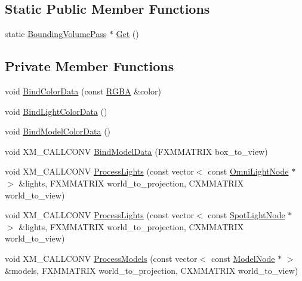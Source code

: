 \subsection*{Static Public Member Functions}
\begin{DoxyCompactItemize}
\item 
static \hyperlink{classmage_1_1_bounding_volume_pass}{Bounding\+Volume\+Pass} $\ast$ \hyperlink{classmage_1_1_bounding_volume_pass_a254c44c1c9f18967c9d6cdb6e53d3bcd}{Get} ()
\end{DoxyCompactItemize}
\subsection*{Private Member Functions}
\begin{DoxyCompactItemize}
\item 
void \hyperlink{classmage_1_1_bounding_volume_pass_a29a98f857f8ae45a0230b96f78f2dcb9}{Bind\+Color\+Data} (const \hyperlink{structmage_1_1_r_g_b_a}{R\+G\+BA} \&color)
\item 
void \hyperlink{classmage_1_1_bounding_volume_pass_a9dcca637d98ea8335777094d3d994f5c}{Bind\+Light\+Color\+Data} ()
\item 
void \hyperlink{classmage_1_1_bounding_volume_pass_af4591758a8dfa7cd19a0f87a0273e470}{Bind\+Model\+Color\+Data} ()
\item 
void X\+M\+\_\+\+C\+A\+L\+L\+C\+O\+NV \hyperlink{classmage_1_1_bounding_volume_pass_ae84dd1e056235a5fdbc7c496b6b99d1d}{Bind\+Model\+Data} (F\+X\+M\+M\+A\+T\+R\+IX box\+\_\+to\+\_\+view)
\item 
void X\+M\+\_\+\+C\+A\+L\+L\+C\+O\+NV \hyperlink{classmage_1_1_bounding_volume_pass_a07613a3b98f9e6cc0cde4affab9051cc}{Process\+Lights} (const vector$<$ const \hyperlink{namespacemage_a1724c6e6b6b5ba535cdd967cbbb4a669}{Omni\+Light\+Node} $\ast$ $>$ \&lights, F\+X\+M\+M\+A\+T\+R\+IX world\+\_\+to\+\_\+projection, C\+X\+M\+M\+A\+T\+R\+IX world\+\_\+to\+\_\+view)
\item 
void X\+M\+\_\+\+C\+A\+L\+L\+C\+O\+NV \hyperlink{classmage_1_1_bounding_volume_pass_ad3f72aff024498f0fe6fde0d42236efb}{Process\+Lights} (const vector$<$ const \hyperlink{namespacemage_aeed5dee4ff6c591eabb0e9114256df4a}{Spot\+Light\+Node} $\ast$ $>$ \&lights, F\+X\+M\+M\+A\+T\+R\+IX world\+\_\+to\+\_\+projection, C\+X\+M\+M\+A\+T\+R\+IX world\+\_\+to\+\_\+view)
\item 
void X\+M\+\_\+\+C\+A\+L\+L\+C\+O\+NV \hyperlink{classmage_1_1_bounding_volume_pass_a634e553ec3c223bc25eba1369d6c6360}{Process\+Models} (const vector$<$ const \hyperlink{classmage_1_1_model_node}{Model\+Node} $\ast$ $>$ \&models, F\+X\+M\+M\+A\+T\+R\+IX world\+\_\+to\+\_\+projection, C\+X\+M\+M\+A\+T\+R\+IX world\+\_\+to\+\_\+view)
\end{DoxyCompactItemize}
